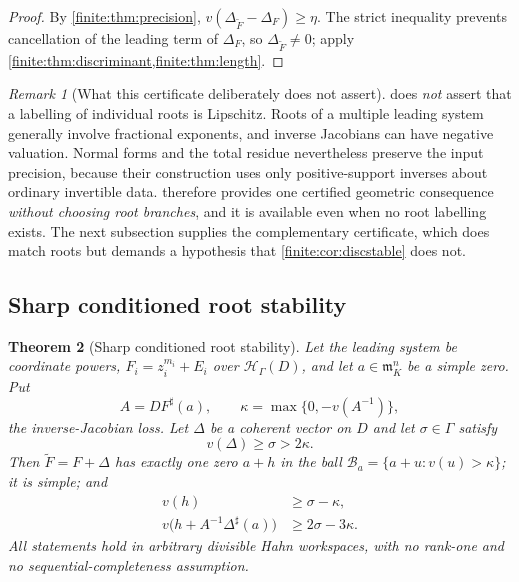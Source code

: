 \documentclass[11pt,letterpaper]{article}
\newtheorem{theorem}{Theorem}[section]
\theoremstyle{definition}
\theoremstyle{remark}
\newtheorem{remark}[theorem]{Remark}
\newcommand{\HH}{\mathscr H}
\newcommand{\mm}{\mathfrak m}
\newcommand{\sh}{^{\sharp}}
\numberwithin{equation}{section}
\begin{document}
\begin{proof}
By \cref{finite:thm:precision}, $v(\Delta_{\widetilde F}-\Delta_F)\geq\eta$. The strict inequality prevents cancellation of the leading term of $\Delta_F$, so $\Delta_{\widetilde F}\neq0$; apply \cref{finite:thm:discriminant,finite:thm:length}.
\end{proof}

\begin{remark}[What this certificate deliberately does not assert]
\label{finite:rem:rootinstability}
 does \emph{not} assert that a labelling of individual roots is Lipschitz. Roots of a multiple leading system generally involve fractional exponents, and inverse Jacobians can have negative valuation. Normal forms and the total residue nevertheless preserve the input precision, because their construction uses only positive-support inverses about ordinary invertible data.  therefore provides one certified geometric consequence \emph{without choosing root branches}, and it is available even when no root labelling exists. The next subsection supplies the complementary certificate, which does match roots but demands a hypothesis that \cref{finite:cor:discstable} does not.
\end{remark}

\subsection{Sharp conditioned root stability}
\label{finite:sec:rootstability}

\begin{theorem}[Sharp conditioned root stability]
\label{finite:thm:rootstability}
Let the leading system be coordinate powers, $F_i=z_i^{m_i}+E_i$ over $\HH_\Gamma(D)$, and let $a\in\mm_K^n$ be a \emph{simple} zero. Put
\begin{equation}\label{finite:eq:kappa}
 A=DF\sh(a),
 \qquad
 \kappa=\max\{0,-v(A^{-1})\},
\end{equation}
the inverse-Jacobian loss. Let $\Delta$ be a coherent vector on $D$ and let $\sigma\in\Gamma$ satisfy
\begin{equation}\label{finite:eq:threshold}
 v(\Delta)\geq\sigma>2\kappa .
\end{equation}
Then $\widetilde F=F+\Delta$ has exactly one zero $a+h$ in the ball $\mathcal B_a=\{a+u:v(u)>\kappa\}$; it is simple; and
\begin{align}
 v(h)&\geq\sigma-\kappa,\label{finite:eq:shiftbound}\\
 v\bigl(h+A^{-1}\Delta\sh(a)\bigr)&\geq2\sigma-3\kappa.\label{finite:eq:errorbound}
\end{align}
All statements hold in arbitrary divisible Hahn workspaces, with no rank-one and no sequential-completeness assumption.
\end{theorem}
\end{document}
